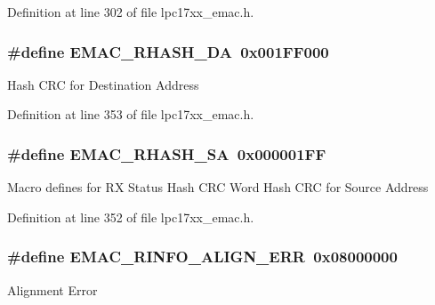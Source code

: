 \-Definition at line 302 of file lpc17xx\-\_\-emac.\-h.

\hypertarget{group___e_m_a_c___private___macros_ga2dda6b636e3e27de0123926a282f04a8}{
\subsubsection[{\-E\-M\-A\-C\-\_\-\-R\-H\-A\-S\-H\-\_\-\-D\-A}]{\setlength{\rightskip}{0pt plus 5cm}\#define {\bf \-E\-M\-A\-C\-\_\-\-R\-H\-A\-S\-H\-\_\-\-D\-A}~0x001\-F\-F000}}\label{group___e_m_a_c___private___macros_ga2dda6b636e3e27de0123926a282f04a8}
\-Hash \-C\-R\-C for \-Destination \-Address 

\-Definition at line 353 of file lpc17xx\-\_\-emac.\-h.

\hypertarget{group___e_m_a_c___private___macros_ga39f6f0b5737d48c84dd3f5b8fe9e8f85}{
\subsubsection[{\-E\-M\-A\-C\-\_\-\-R\-H\-A\-S\-H\-\_\-\-S\-A}]{\setlength{\rightskip}{0pt plus 5cm}\#define {\bf \-E\-M\-A\-C\-\_\-\-R\-H\-A\-S\-H\-\_\-\-S\-A}~0x000001\-F\-F}}\label{group___e_m_a_c___private___macros_ga39f6f0b5737d48c84dd3f5b8fe9e8f85}
\-Macro defines for \-R\-X \-Status \-Hash \-C\-R\-C \-Word \-Hash \-C\-R\-C for \-Source \-Address 

\-Definition at line 352 of file lpc17xx\-\_\-emac.\-h.

\hypertarget{group___e_m_a_c___private___macros_gafb02b437865cf0ccb49956ab06b9f9a9}{
\subsubsection[{\-E\-M\-A\-C\-\_\-\-R\-I\-N\-F\-O\-\_\-\-A\-L\-I\-G\-N\-\_\-\-E\-R\-R}]{\setlength{\rightskip}{0pt plus 5cm}\#define {\bf \-E\-M\-A\-C\-\_\-\-R\-I\-N\-F\-O\-\_\-\-A\-L\-I\-G\-N\-\_\-\-E\-R\-R}~0x08000000}}\label{group___e_m_a_c___private___macros_gafb02b437865cf0ccb49956ab06b9f9a9}
\-Alignment \-Error 

